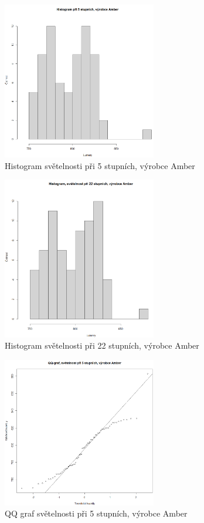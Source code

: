 \documentclass[czech]{article}%
\begin{document}
\newpage
\begin{figure}[H]
	\centering
	\includegraphics[width=0.6\textwidth]{Figures/Histogram5.png}
	\caption[Histogram světelnosti 5C, Amber]{Histogram světelnosti při 5 stupních, výrobce Amber}
	\label{fig:Histogram5}
\end{figure}

\begin{figure}[H]
	\centering
	\includegraphics[width=0.6\textwidth]{Figures/Histogram22.png}
	\caption[Histogram světelnosti 22C, Amber]{Histogram světelnosti při 22 stupních, výrobce Amber}
	\label{fig:Histogram22}
\end{figure}

\newpage
\begin{figure}[H]
	\centering
	\includegraphics[width=0.6\textwidth]{Figures/QQ5.png}
	\caption[QQ graf světelnosti 5C, Amber]{QQ graf světelnosti při 5 stupních, výrobce Amber}
	\label{fig:QQ5}
\end{figure}
\end{document}
